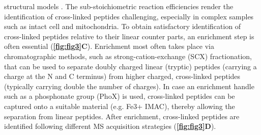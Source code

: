 structural models \cite{Sinnott_2020}. The sub-stoichiometric reaction efficiencies render the identification of cross-linked peptides challenging, especially in complex samples such as intact cell and mitochondria. To obtain satisfactory identification of cross-linked peptides relative to their linear counter parts, an enrichment step is often essential (\textbf{\autoref{fig:fig3}C}). Enrichment most often takes place via chromatographic methods, such as strong-cation-exchange (SCX) fractionation, that can be used to separate doubly charged linear (tryptic) peptides (carrying a charge at the N and C terminus) from higher charged, cross-linked peptides (typically carrying double the number of charges). In case an enrichment handle such as a phosphonate group (PhoX) is used, cross-linked peptides can be captured onto a suitable material (e.g. Fe3+ IMAC), thereby allowing the separation from linear peptides. After enrichment, cross-linked peptides are identified following different MS acquisition strategies (\textbf{\autoref{fig:fig3}D}).

